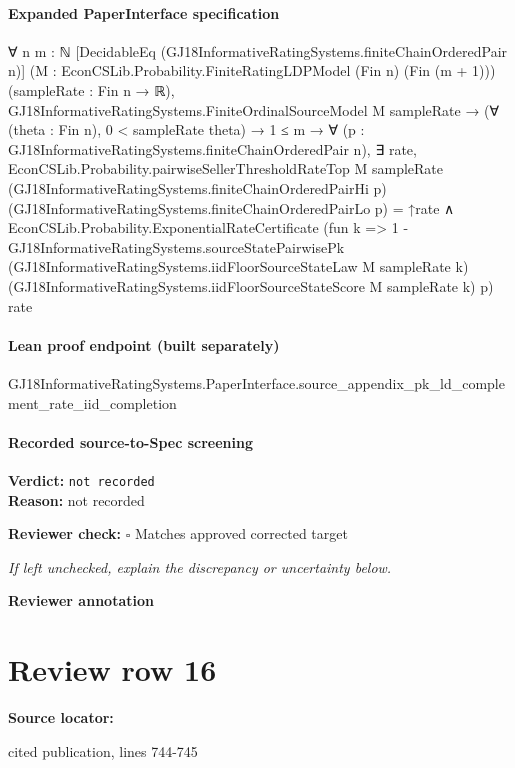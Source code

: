 \documentclass[10pt]{article}
\newcommand{\reviewerbox}{%
  \par\noindent\fbox{\parbox{0.96\linewidth}{\rule{0pt}{0.38in}}}\par
}
\newcommand{\reviewmatch}[1]{%
  \par\noindent\textbf{Reviewer check:} $\square$\; #1\par
  \noindent\emph{If left unchecked, explain the discrepancy or uncertainty below.}\par
}
\begin{document}
\paragraph{Expanded PaperInterface specification}
\begin{ReviewVerbatim}
∀ {n m : ℕ} [DecidableEq (GJ18InformativeRatingSystems.finiteChainOrderedPair n)]
  (M : EconCSLib.Probability.FiniteRatingLDPModel (Fin n) (Fin (m + 1))) (sampleRate : Fin n → ℝ),
  GJ18InformativeRatingSystems.FiniteOrdinalSourceModel M sampleRate →
    (∀ (theta : Fin n), 0 < sampleRate theta) →
      1 ≤ m →
        ∀ (p : GJ18InformativeRatingSystems.finiteChainOrderedPair n),
          ∃ rate,
            EconCSLib.Probability.pairwiseSellerThresholdRateTop M sampleRate
                  (GJ18InformativeRatingSystems.finiteChainOrderedPairHi p)
                  (GJ18InformativeRatingSystems.finiteChainOrderedPairLo p) =
                ↑rate ∧
              EconCSLib.Probability.ExponentialRateCertificate
                (fun k =>
                  1 -
                    GJ18InformativeRatingSystems.sourceStatePairwisePk
                      (GJ18InformativeRatingSystems.iidFloorSourceStateLaw M sampleRate k)
                      (GJ18InformativeRatingSystems.iidFloorSourceStateScore M sampleRate k) p)
                rate
\end{ReviewVerbatim}

\paragraph{Lean proof endpoint (built separately)}\begin{ReviewVerbatim}
GJ18InformativeRatingSystems.PaperInterface.source_appendix_pk_ld_complement_rate_iid_completion
\end{ReviewVerbatim}

\paragraph{Recorded source-to-Spec screening}
\textbf{Verdict:} \texttt{not recorded}
\\
\textbf{Reason:} not recorded
\reviewmatch{Matches approved corrected target}
\noindent\textbf{Reviewer annotation}\par
\reviewerbox
\clearpage
\hypertarget{source-claim-3e93fe2b3603715e}{}
\section*{Review row 16}
\textbf{Source locator:} {\footnotesize\raggedright cited publication, lines 744-\allowbreak{}745\par}
\end{document}
